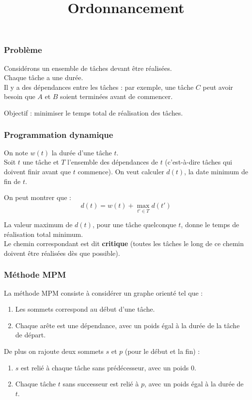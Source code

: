 \documentclass[draft]{beamer}
\begin{document}
\title{Ordonnancement}

\begin{frame}
    \titlepage
\end{frame}

\begin{frame}[fragile]
    \frametitle{Problème}
    Considérons un ensemble de tâches devant être réalisées.\\
    Chaque tâche a une durée.\\
    Il y a des dépendances entre les tâches : par exemple, une tâche $C$ peut avoir besoin que $A$ et $B$ soient terminées avant de commencer.
    \vspace{2\baselineskip}
    \pause

    Objectif : minimiser le temps total de réalisation des tâches.
\end{frame}

\begin{frame}
    \frametitle{Programmation dynamique}
    On note $w(t)$ la durée d'une tâche $t$.\\
    Soit $t$ une tâche et $T$ l'ensemble des dépendances de $t$ (c'est-à-dire tâches qui doivent finir avant que $t$ commence).
    On veut calculer $d(t)$, la date minimum de fin de $t$.
    \pause
    \vspace{\baselineskip}

    On peut montrer que :
    $$\boxed{d(t) = w(t) + \max_{t' \in T} d(t')}$$
    \pause
    \vspace{\baselineskip}

    La valeur maximum de $d(t)$, pour une tâche quelconque $t$, donne le temps de réalisation total minimum.\\
    Le chemin correspondant est dit \textbf{critique} (toutes les tâches le long de ce chemin doivent être réalisées dès que possible).
\end{frame}

\begin{frame}[fragile]
    \frametitle{Méthode MPM}
    La méthode MPM consiste à considérer un graphe orienté tel que :
    \begin{enumerate}
        \item Les sommets correspond au début d'une tâche.
        \item Chaque arête est une dépendance, avec un poids égal à la durée de la tâche de départ.
    \end{enumerate}
    \pause
    \vspace{\baselineskip}

    De plus on rajoute deux sommets $s$ et $p$ (pour le début et la fin) :
    \begin{enumerate}
        \item $s$ est relié à chaque tâche sans prédécesseur, avec un poids 0.
        \item Chaque tâche $t$ sans successeur est relié à $p$, avec un poids égal à la durée de $t$.
    \end{enumerate}
\end{frame}
\end{document}
